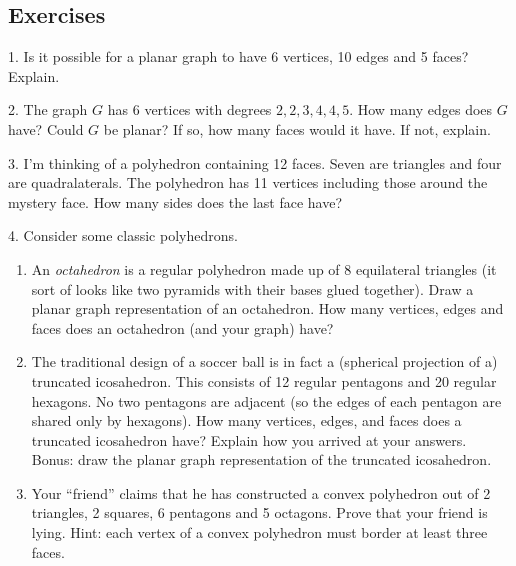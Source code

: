 \documentclass[12pt,]{book}
\theoremstyle{plain}
\theoremstyle{definition}
\theoremstyle{definition}
\theoremstyle{definition}
\numberwithin{equation}{chapter}
\begin{document}
\subsection*{Exercises}\label{exercises_gt-planar}
\begin{exerciselist}
\item[1.]\hypertarget{exercise-185}{}\hypertarget{p-1655}{}%
Is it possible for a planar graph to have 6 vertices, 10 edges and 5 faces? Explain.%
\par\smallskip
\item[2.]\hypertarget{exercise-186}{}\hypertarget{p-1657}{}%
The graph \(G\) has 6 vertices with degrees \(2, 2, 3, 4, 4, 5\). How many edges does \(G\) have? Could \(G\) be planar? If so, how many faces would it have.  If not, explain.%
\par\smallskip
\item[3.]\hypertarget{exercise-187}{}\hypertarget{p-1659}{}%
I'm thinking of a polyhedron containing 12 faces. Seven are triangles and four are quadralaterals. The polyhedron has 11 vertices including those around the mystery face. How many sides does the last face have?%
\par\smallskip
\item[4.]\hypertarget{exercise-188}{}\hypertarget{p-1661}{}%
Consider some classic polyhedrons. \leavevmode%
\begin{enumerate}[label=(\alph*)]
\item\hypertarget{li-735}{}\hypertarget{p-1662}{}%
An \emph{octahedron} is a regular polyhedron made up of 8 equilateral triangles (it sort of looks like two pyramids with their bases glued together). Draw a planar graph representation of an octahedron. How many vertices, edges and faces does an octahedron (and your graph) have? %
\item\hypertarget{li-736}{}\hypertarget{p-1663}{}%
The traditional design of a soccer ball is in fact a (spherical projection of a) truncated icosahedron. This consists of 12 regular pentagons and 20 regular hexagons. No two pentagons are adjacent (so the edges of each pentagon are shared only by hexagons). How many vertices, edges, and faces does a truncated icosahedron have? Explain how you arrived at your answers. Bonus: draw the planar graph representation of the truncated icosahedron. %
\item\hypertarget{li-737}{}\hypertarget{p-1664}{}%
Your ``friend'' claims that he has constructed a convex polyhedron out of 2 triangles, 2 squares, 6 pentagons and 5 octagons. Prove that your friend is lying. Hint: each vertex of a convex polyhedron must border at least three faces. %

\end{enumerate}
\end{exerciselist}
\end{document}
